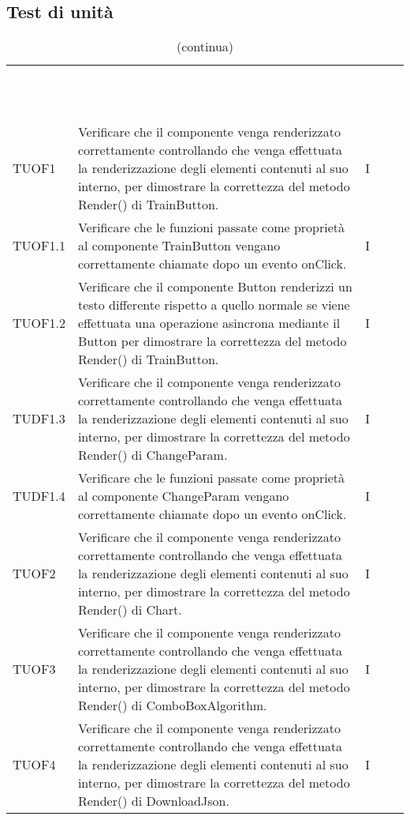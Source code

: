 \subsection{Test di unità}
\begin{longtable}{C{2cm} L{8cm} C{2cm}}
\caption{Tabella dei test di unità} \\
\textcolor{white}{\textbf{Codice}} &
\textcolor{white}{\textbf{Descrizione}} &
\textcolor{white}{\textbf{Esito}} \\
		\endfirsthead
		\caption[]{(continua)} \\
\textcolor{white}{\textbf{Codice}} &
\textcolor{white}{\textbf{Descrizione}} &
\textcolor{white}{\textbf{Esito}} \\
		\endhead
TUOF1 & Verificare che il componente venga renderizzato correttamente controllando che venga effettuata la renderizzazione degli elementi contenuti al suo interno, per dimostrare la correttezza del metodo Render() di TrainButton. & I \\
TUOF1.1 & Verificare che le funzioni passate come proprietà al componente TrainButton vengano correttamente chiamate dopo un evento onClick. & I \\
TUOF1.2 & Verificare che il componente Button renderizzi un testo differente rispetto a quello normale se viene effettuata una operazione asincrona mediante il Button per dimostrare la correttezza del metodo Render() di TrainButton. & I\\
TUDF1.3 & Verificare che il componente venga renderizzato correttamente controllando che venga effettuata la renderizzazione degli elementi contenuti al suo interno, per dimostrare la correttezza del metodo Render() di ChangeParam. & I \\
TUDF1.4 & Verificare che le funzioni passate come proprietà al componente ChangeParam vengano correttamente chiamate dopo un evento onClick. & I \\
TUOF2 & Verificare che il componente venga renderizzato correttamente controllando che venga effettuata la renderizzazione degli elementi contenuti al suo interno, per dimostrare la correttezza del metodo Render() di Chart. & I \\
TUOF3 & Verificare che il componente venga renderizzato correttamente controllando che venga effettuata la renderizzazione degli elementi contenuti al suo interno, per dimostrare la correttezza del metodo Render() di ComboBoxAlgorithm. & I \\
TUOF4 & Verificare che il componente venga renderizzato correttamente controllando che venga effettuata la renderizzazione degli elementi contenuti al suo interno, per dimostrare la correttezza del metodo Render() di DownloadJson. & I \\

\end{longtable}
